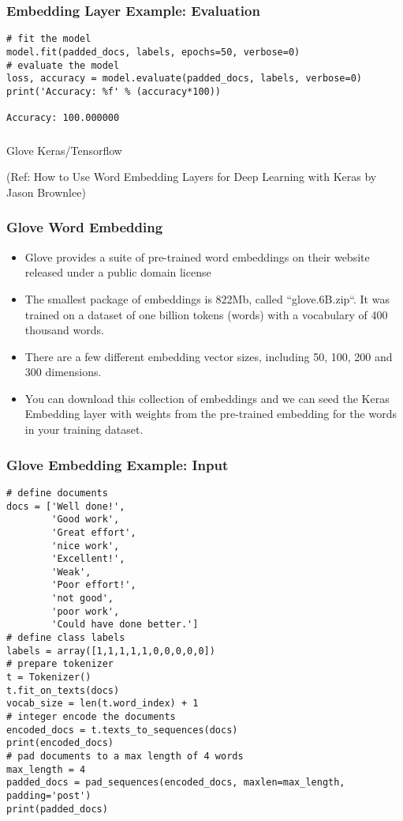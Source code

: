 \begin{frame}[fragile]\frametitle{Embedding Layer Example: Evaluation}

\begin{lstlisting}
# fit the model
model.fit(padded_docs, labels, epochs=50, verbose=0)
# evaluate the model
loss, accuracy = model.evaluate(padded_docs, labels, verbose=0)
print('Accuracy: %f' % (accuracy*100))

Accuracy: 100.000000
\end{lstlisting}
\end{frame}


\begin{frame}[fragile]\frametitle{}
\begin{center}
{\Large Glove Keras/Tensorflow}
\end{center}

{\tiny (Ref: How to Use Word Embedding Layers for Deep Learning with Keras
by Jason Brownlee)}
\end{frame}

\begin{frame}[fragile]\frametitle{Glove Word Embedding}

\begin{itemize}
\item Glove provides a suite of pre-trained word embeddings on their website released under a public domain license
\item The smallest package of embeddings is 822Mb, called “glove.6B.zip“. It was trained on a dataset of one billion tokens (words) with a vocabulary of 400 thousand words. 
\item There are a few different embedding vector sizes, including 50, 100, 200 and 300 dimensions.
\item You can download this collection of embeddings and we can seed the Keras Embedding layer with weights from the pre-trained embedding for the words in your training dataset.
\end{itemize}


\end{frame}

\begin{frame}[fragile]\frametitle{Glove Embedding Example: Input}

\begin{lstlisting}
# define documents
docs = ['Well done!',
		'Good work',
		'Great effort',
		'nice work',
		'Excellent!',
		'Weak',
		'Poor effort!',
		'not good',
		'poor work',
		'Could have done better.']
# define class labels
labels = array([1,1,1,1,1,0,0,0,0,0])
# prepare tokenizer
t = Tokenizer()
t.fit_on_texts(docs)
vocab_size = len(t.word_index) + 1
# integer encode the documents
encoded_docs = t.texts_to_sequences(docs)
print(encoded_docs)
# pad documents to a max length of 4 words
max_length = 4
padded_docs = pad_sequences(encoded_docs, maxlen=max_length, padding='post')
print(padded_docs)
\end{lstlisting}
\end{frame}

